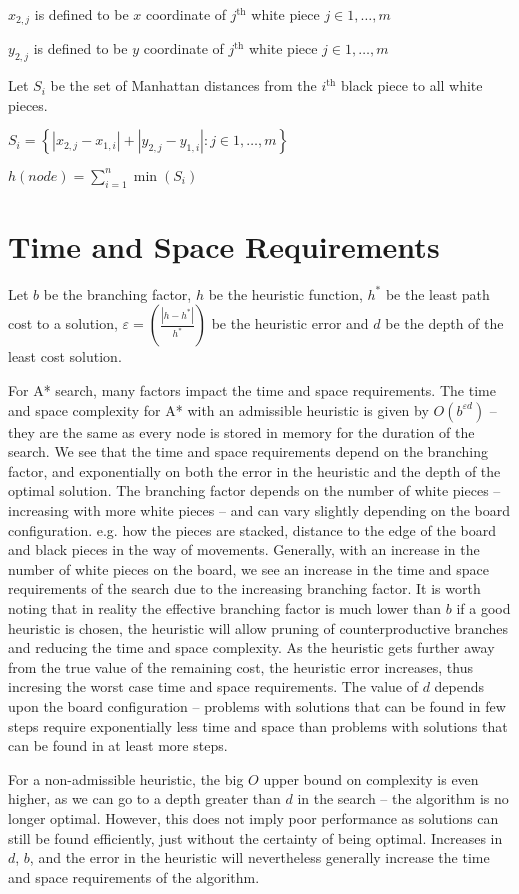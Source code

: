 \documentclass[a4paper,11pt]{article}
\begin{document}
$x_{2,j}$  is defined to be $x$ coordinate of $j^{\text{th}}$ white piece $j \in {1,\dots,m}$

$y_{2,j}$  is defined to be $y$ coordinate of $j^{\text{th}}$ white piece $j \in {1,\dots,m}$

Let $S_i$ be the set of Manhattan distances from the $i^{\text{th}}$ black piece to all white pieces.

$S_i = \left\{\left| x_{2,j} - x_{1,i}\right| + \left| y_{2,j} - y_{1,i}\right| :j \in 1,\dots,m\right\}$

$h(node) = \displaystyle\sum_{i=1}^n{\min\left(S_i\right)}$

\section*{Time and Space Requirements}
Let $b$ be the branching factor, $h$ be the heuristic function, $h^*$ be the least
path cost to a solution, $\varepsilon = \left(\frac{\left|h-h^* \right|}{h^*}\right)$ 
be the heuristic error and $d$ be the depth of the least cost solution.

For A* search, many factors impact the time and space requirements. 
The time and space complexity for A* with an 
admissible heuristic is given by $O(b^{\varepsilon d})$ -- they are the 
same as every node is stored in memory for the duration of the search. 
We see that the time and space requirements depend on the branching factor, and exponentially on
both the error in the heuristic and the depth of the optimal solution.
The branching factor depends on the number of white pieces -- increasing with more white pieces -- and can vary slightly depending on the board configuration. 
e.g. how the pieces are stacked, distance to the edge of the board and black pieces in the way of movements. 
Generally, with an increase in the number of white pieces on the board, we see
an increase in the time and space requirements of the search due to the increasing branching factor.
It is worth noting that in reality the effective branching factor is much lower
than $b$ if a good heuristic is chosen, the heuristic will allow pruning of counterproductive branches and 
reducing the time and space complexity. 
As the heuristic gets further away from the true value of the remaining cost, the heuristic error increases, 
thus incresing the worst case time and space requirements.
The value of $d$ depends upon the board configuration -- problems with solutions 
that can be found in few steps require exponentially less time and space 
than problems with solutions that can be found in at least more steps.

For a non-admissible heuristic, the big $O$ upper bound on complexity is 
even higher, as we can go to a depth greater than $d$ in the search --
the algorithm is no longer optimal. However, this does not imply poor 
performance as solutions can still be found efficiently, just without
the certainty of being optimal. Increases in $d$, $b$, and the error 
in the heuristic will nevertheless generally increase the time and space 
requirements of the algorithm.
\end{document}
